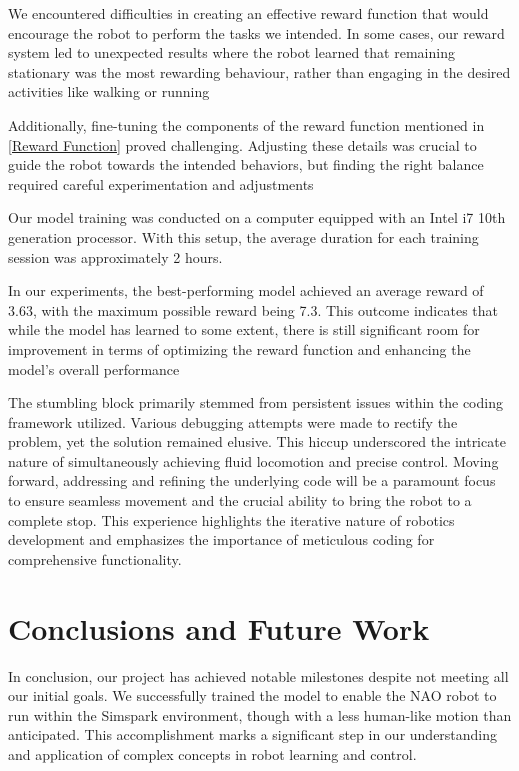 \documentclass[conference]{IEEEtran}
\begin{document}
We encountered difficulties in creating an effective reward function that would encourage the robot to perform the tasks we intended. In some cases, our reward system led to unexpected results where the robot learned that remaining stationary was the most rewarding behaviour, rather than engaging in the desired activities like walking or running

Additionally, fine-tuning the components of the reward function mentioned in \ref{Reward Function} proved challenging. Adjusting these details was crucial to guide the robot towards the intended behaviors, but finding the right balance required careful experimentation and adjustments

Our model training was conducted on a computer equipped with an Intel i7 10th generation processor. With this setup, the average duration for each training session was approximately 2 hours.

In our experiments, the best-performing model achieved an average reward of 3.63, with the maximum possible reward being 7.3. This outcome indicates that while the model has learned to some extent, there is still significant room for improvement in terms of optimizing the reward function and enhancing the model's overall performance


The stumbling block primarily stemmed from persistent issues within the coding framework utilized. Various debugging attempts were made to rectify the problem, yet the solution remained elusive. This hiccup underscored the intricate nature of simultaneously achieving fluid locomotion and precise control. Moving forward, addressing and refining the underlying code will be a paramount focus to ensure seamless movement and the crucial ability to bring the robot to a complete stop. This experience highlights the iterative nature of robotics development and emphasizes the importance of meticulous coding for comprehensive functionality.

\section{Conclusions and Future Work}\label{Conclusions and Future Work}

In conclusion, our project has achieved notable milestones despite not meeting all our initial goals. We successfully trained the model to enable the NAO robot to run within the Simspark environment, though with a less human-like motion than anticipated. This accomplishment marks a significant step in our understanding and application of complex concepts in robot learning and control.
\end{document}
